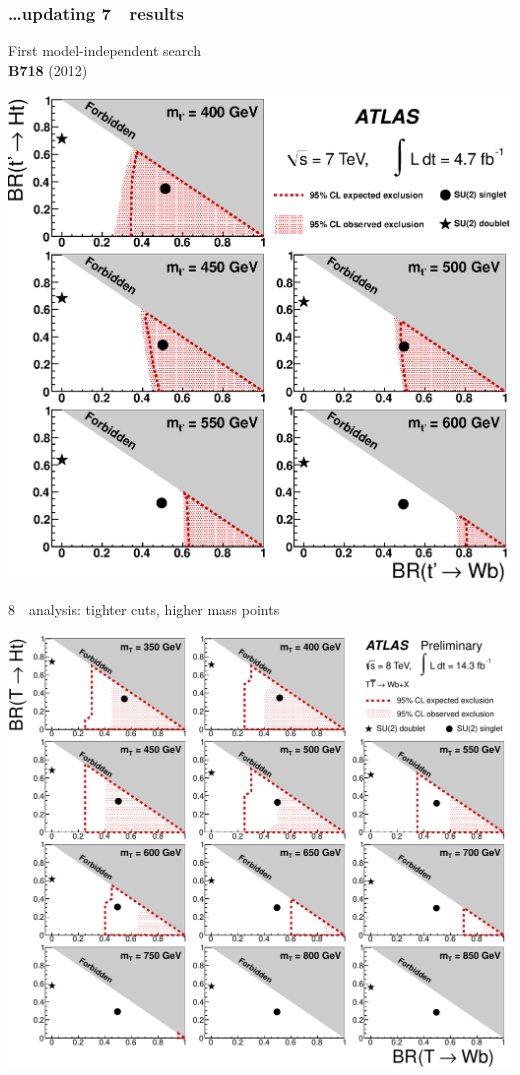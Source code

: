 \begin{frame}\frametitle{\dots updating 7~\tev\ results}
\centering\footnotesize

\begin{minipage}{.5\textwidth}\centering
First model-independent search\\

{ {\bf B718} (2012)~\cite{ATLAS:2012qe}}

\includegraphics[width=1.\textwidth]{../appendices/figures/wbwb/fig_04}

\end{minipage}\begin{minipage}{.5\textwidth}\centering

\myskip\scriptsize

8~\tev\ analysis: tighter cuts, higher mass points

\myskip
\includegraphics[width=1.\textwidth]{pics/lim_Scan2D_tight_Bin1.pdf}


\end{minipage}
\end{frame}
